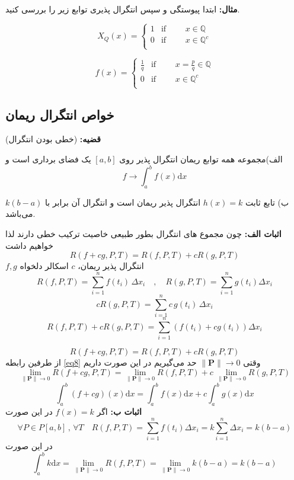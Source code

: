 \documentclass[12pt]{report}
\begin{document}
\textbf{مثال:}
ابتدا پیوستگی و سپس انتگرال پذیری توابع زیر را بررسی کنید.

\begin{equation*}
	X_Q(x) = 
	\begin{cases}
		1 & \text{if }\qquad x  \in \mathbb{Q} \\
		0 & \text{if }\qquad x \in  \mathbb{Q}^c\\
		
	\end{cases}
\end{equation*}

\begin{equation*}
	f(x) = 
	\begin{cases}
		\frac{1}{q} & \text{if }\qquad x = \frac{p}{q}  \in \mathbb{Q} \\
		0 & \text{if }\qquad x \in  \mathbb{Q}^c\\
		
	\end{cases}
\end{equation*}
\subsection{خواص انتگرال ریمان}
\textbf{قضیه:}
(خطی بودن انتگرال)

الف)مجموعه همه توابع ریمان انتگرال پذیر روی
$[a, b]$
یک فضای برداری است و 
\[
f\rightarrow \int_{a}^{b} f(x) \mathrm{d}x
\]

ب) تابع ثابت 
$h(x) = k$
انتگرال پذیر ریمان است و انتگرال آن برابر با
$k(b-a)$
می‌باشد.

\textbf{اثبات الف:}
چون مجموع های انتگرال بطور طبیعی خاصیت ترکیب خطی دارند لذا خواهیم داشت
\[
R(f + cg, P,T) = R(f,P,T) + cR(g, P, T)
\]
$f , g$
انتگرال پذیر ریمان،
$c$
 اسکالر دلخواه
\[
R(f, P, T) = \sum_{i = 1}^n f(t_i) \,\Delta x_i \quad , \quad R(g, P, T) = \sum_{i = 1}^n g(t_i) \Delta x_i
\]
\[
cR(g, P, T) = \sum_{i = 1}^n  c\, g(t_i) \, \Delta x_i
\]
\[
R(f, P, T) + cR(g, P, T) = \sum_{i = 1}^n (f(t_i) + cg(t_i)) \Delta x_i
\]

\begin{equation}\label{eq8}
	R(f+cg, P, T) = R(f, P, T) + cR(g, P, T)
\end{equation}
از طرفین رابطه
\eqref{eq8}
وقتی
$\lVert \mathbf{P} \rVert \to 0$
حد می‌‌گیریم در این صورت داریم
\[
\lim_{ \lVert \mathbf{P} \rVert \to 0} R(f + cg,P, T) = \lim_{ \lVert \mathbf{P} \rVert \to 0} R(f, P, T) + c\,\lim_{ \lVert \mathbf{P} \rVert \to 0} R(g, P, T)
\]
\[
\int_{a}^{b} (f+cg)(x) \mathrm{d}x = \int_{a}^{b} f(x) \mathrm{d}x + c\int_{a}^{b} g(x) \mathrm{d}x
\]
\textbf{اثبات ب:}
اگر 
$f(x) = k$
در این صورت
\[
\forall P \in P[a, b] \,,\,\forall T \quad R(f, P,T) = \sum_{i = 1}^n f(t_i) \Delta x_i= k\sum_{i = 1}^n \Delta x_i = k(b-a)
\]
در این صورت
\[
\int_{a}^{b} k \mathrm{d}x = \lim_{ \lVert \mathbf{P} \rVert \to 0} R(f, P,T) = \lim_{ \lVert \mathbf{P} \rVert \to 0} k(b-a) = k(b-a)
\]
\end{document}
